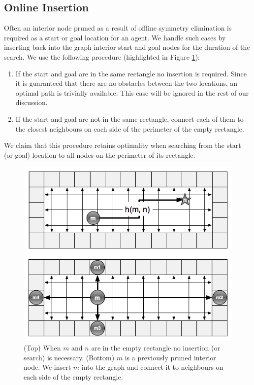 \subsection{Online Insertion}
\label{cha::rsr::insertion}
Often an interior node pruned as a result of offline symmetry elimination
is required as a start or goal location for an agent.
We handle such cases by inserting back into the graph interior start and goal nodes  
for the duration of the search.
We use the following procedure (highlighted in Figure \ref{fig::rsr::insertion}):
\begin{enumerate}
\item{If the start and goal are in the same rectangle no insertion is required.
 Since it is guaranteed that there are no obstacles between the two locations, an optimal 
 path is trivially available. This case will be ignored in the rest of our discussion.}
\item{If the start and goal are not in the same rectangle, connect each of them
to the closest neighbours on each side of the perimeter of the empty rectangle.}
\end{enumerate}
We claim that this procedure retains optimality when searching from the start (or goal) location
to all nodes on the perimeter of its rectangle.

\begin{figure}[t]
	\vspace{-4pt}
       \begin{center}
           \includegraphics[scale=0.50, trim = 10mm 10mm 10mm 0mm]{chapter_rsr/diagrams/roomtraversal.png}
       \end{center}
	\vspace{-3pt}
       \caption{(Top) When $m$ and $n$ are in the empty rectangle no insertion (or search) is necessary.
				(Bottom) $m$ is a previously pruned interior node.
				We insert $m$ into the graph and connect it to neighbours on each side of the empty rectangle.}
	\label{fig::rsr::insertion}
\end{figure}

